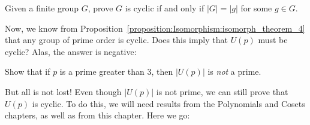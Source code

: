 \begin{exercise}{}
Given a finite group $G$, prove $G$ is cyclic if and only if $|G| = |g|$ for some $g \in G$.
\end{exercise} 

Now, we know from Proposition~\ref{proposition:Isomorphism:isomorph_theorem_4} that any group of prime order is cyclic. Does this imply that $U(p)$ must be cyclic?  Alas, the answer is negative:

\begin{exercise}{}
Show that if $p$ is a prime greater than 3, then $|U(p)|$ is \emph{not} a prime.
\end{exercise}

But all is not lost! Even though  $|U(p)|$ is not prime, we can still prove that $U(p)$ is cyclic. To do this, we will need results from the Polynomials and Cosets chapters, as well as from this chapter. Here we go:


